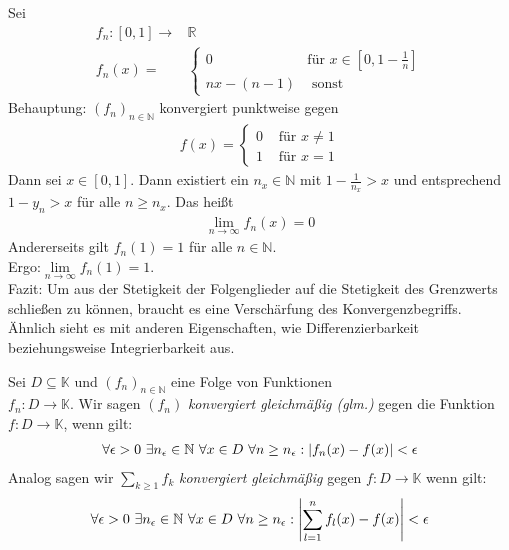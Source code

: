 \begin{Beispiel}{
	Sei 
	\begin{align*}
		f_n: [0,1] \rightarrow & \mathbb{R} \\
		f_n(x) = & \begin{cases} 0 & \text{für } x 
			\in [0, 1 - \frac{1}{n}] \\ nx - (n-1) & \text{ sonst}
			\end{cases}
	\end{align*}
		Behauptung: $(f_n)_{n \in \mathbb{N}}$ konvergiert punktweise gegen 
	\begin{align*}
		f(x) = \begin{cases} 0 & \text{ für } x \neq 1 \\
		1 & \text{ für } x = 1 \end{cases}
	\end{align*}
	Dann sei $x \in [0,1]$. Dann existiert ein $n_x \in \mathbb{N}$ mit 
	$1- \frac{1}{n_x} > x$ und entsprechend $1 - y_n > x$ für alle $n \geq n_x$. 
	Das heißt
\begin{align*}
		\lim \limits_{n \rightarrow \infty}{ f_n(x)} = 0
	\end{align*}
	Andererseits gilt $f_n(1) = 1$ für alle $n \in \mathbb{N}$. \\
	Ergo:$\lim\limits_{n\rightarrow \infty}{f_n(1) = 1}$. \\
	Fazit: Um aus der Stetigkeit der Folgenglieder auf die Stetigkeit des Grenzwerts 
	schließen zu können, braucht es eine Verschärfung des Konvergenzbegriffs.
	Ähnlich sieht es mit anderen Eigenschaften, wie Differenzierbarkeit 
	beziehungsweise Integrierbarkeit aus.
}\end{Beispiel}

\begin{Definition}{
	Sei $D \subseteq \mathbb{K}$ und $(f_n)_{n \in \mathbb{N}}$ eine Folge von 
	Funktionen \\ $f_n: D \rightarrow \mathbb{K}$. Wir sagen $(f_n)$ 
	\emph{konvergiert gleichmäßig (glm.)} gegen die Funktion $f: D \rightarrow 
	\mathbb{K}$, wenn gilt:
	\begin{align*}
		\forall \epsilon > 0 \text{ } \exists n_{\epsilon} \in \mathbb{N} 
			\text{ } \forall x \in D \text{ } \forall n \geq n_{\epsilon} 
			: \abs{f_n(x) - f(x)} < \epsilon
	\end{align*}
	Analog sagen wir $\sum_{k \geq 1} f_k$ \emph{konvergiert gleichmäßig} gegen 
	$f: D \rightarrow \mathbb{K}$ wenn gilt:
	\begin{align*}
		\forall \epsilon > 0 \text{ } \exists n_{\epsilon} \in \mathbb{N} 
			\text{ } \forall x \in D \text{ } \forall n \geq n_{\epsilon}: 
			\abs{\sum_{l=1}^n f_l(x) - f(x)} < \epsilon
	\end{align*}
}\end{Definition}

